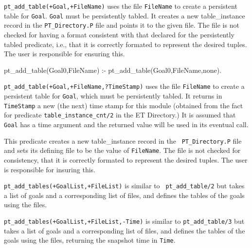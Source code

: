 \begin{description}
%
{\tt pt\_add\_table(+Goal,+FileName)} uses
the file {\tt FileName} to create a persistent table for {\tt Goal}.
{\tt Goal} must be persistently tabled. It creates a new
table\_instance record in the {\tt PT\_Directory.P} file and points it
to the given file.  The file is not checked for having a format
consistent with that declared for the persistently tabled predicate,
i.e., that it is correctly formated to represent the desired tuples.
The user is responsible for ensuring this.  

pt\_add\_table(Goal0,FileName) :-
	pt\_add\_table(Goal0,FileName,none).

%
{\tt pt\_add\_table(+Goal,+FileName,?TimeStamp)} uses the
file {\tt FileName} to create a persistent table for {\tt Goal}, which
must be persistently tabled.  It returns in {\tt TimeStamp} a new (the
next) time stamp for this module (obtained from the fact for predicate
{\tt table\_instance\_cnt/2} in the ET Directory.)  It is assumed that
{\tt Goal} has a time argument and the returned value will be used in
its eventual call.

This predicate creates a new table\_instance record in the {\tt
  PT\_Directory.P} file and sets its defining file to be the value of
{\tt FileName}.  The file is not checked for consistency, that it is
correctly formated to represent the desired tuples.  The user is
responsible for insuring this.  

%
{\tt pt\_add\_tables(+GoalList,+FileList)} is similar to {\tt
  pt\_add\_table/2} but takes a list of goals and a corresponding list
of files, and defines the tables of the goals using the files.

%
{\tt pt\_add\_tables(+GoalList,+FileList,-Time)} is similar to
{\tt pt\_add\_table/3} but takes a list of goals and a corresponding
list of files, and defines the tables of the goals using the files,
returning the snapshot time in {\tt Time}.  


\end{description}
